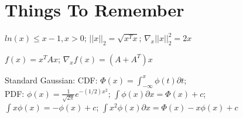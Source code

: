 \section*{Things To Remember}
$ln(x) \leq x - 1, x>0$; $||x||_2 = \sqrt{x^T x}$; $\nabla_x ||x||_2^2 = 2 x$%

$f(x) = x^T A x$; $\nabla_x f(x) = (A + A^T) x$


Standard Gaussian: CDF: $\Phi(x) = \int_{-\infty}^{x} \phi(t) \partial t$;\\ %
PDF: $\phi(x) = \frac{1}{\sqrt{2\pi}} e^{-(1/2)x^2}$; $\int \phi(x) \partial x = \Phi(x) + c$;\\
$\int x \phi(x) = -\phi(x) + c$; $\int x^2 \phi(x) \partial x = \Phi(x) -x \phi(x) + c$

